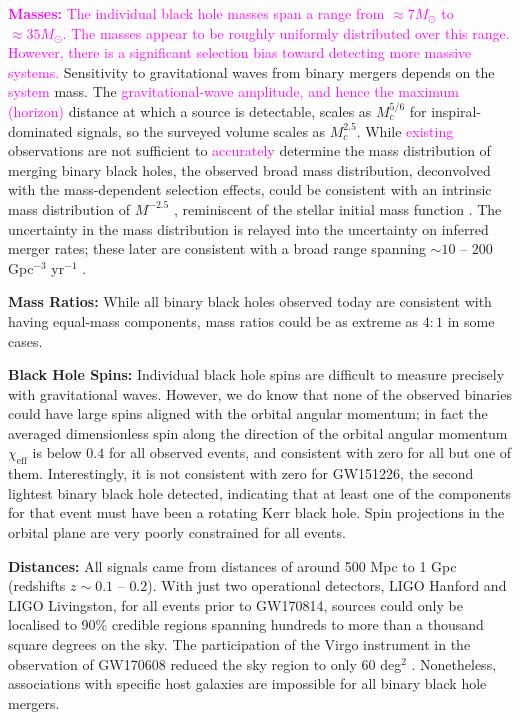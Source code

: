 \documentclass[iop,onecolumn]{revtex4}
\newcommand{\ilya}[1]{\textcolor{magenta}{#1}}
\begin{document}
\textbf{\ilya{Masses:}} \ilya{The individual black hole masses span a range from $\approx 7 M_\odot$ to $\approx 35 M_\odot$.  The masses appear to be roughly uniformly distributed over this range.  However, there is a significant selection bias  toward detecting more massive systems.}  Sensitivity to gravitational waves from binary mergers depends on the \ilya{system} mass.  The \ilya{gravitational-wave amplitude, and hence the maximum (horizon)} distance at which a source is detectable, scales as $M_c^{5/6}$ for inspiral-dominated signals, so the surveyed volume scales as $M_c^{2.5}$.  While \ilya{existing} observations are not sufficient to \ilya{accurately} determine the mass distribution of merging binary black holes, the observed broad mass distribution, deconvolved with the mass-dependent selection effects, could be consistent with an intrinsic mass distribution of $M^{-2.5}$ \ilya{\citep{BBH:O1}}, reminiscent of the stellar initial mass function \citep{Salpeter:1955}.  The uncertainty in the mass distribution is relayed into the uncertainty on inferred merger rates; these later are consistent with a broad range spanning $\sim 10$ -- $200$ Gpc$^{-3}$ yr$^{-1}$ \ilya{\citep{GW170104}}.  

\textbf{Mass Ratios:} While all binary black holes observed today are consistent with having equal-mass components, mass ratios could be as extreme as $4:1$ in some cases.  

\textbf{Black Hole Spins:} Individual black hole spins are difficult to measure precisely with gravitational waves.  However, we do know that none of the observed binaries could have large spins aligned with the orbital angular momentum; in fact the averaged dimensionless spin along the direction of the orbital angular momentum $\chi_\textrm{eff}$ is below $0.4$ for all observed events, and consistent with zero for all but one of them.  Interestingly, it is not consistent with zero for GW151226, the second lightest binary black hole detected, indicating that at least one of the components for that event must have been a rotating Kerr black hole.  Spin projections in the orbital plane are very poorly constrained for all events.

\textbf{Distances:} All signals came from distances of around 500 Mpc to 1 Gpc (redshifts $z\sim 0.1$ -- $0.2$).  With just two operational detectors, LIGO Hanford and LIGO Livingston, for all events prior to GW170814, sources could only be localised to 90\% credible regions spanning hundreds to more than a thousand square degrees on the sky.  The participation of the Virgo instrument in the observation of GW170608 reduced the sky region to only 60 deg$^2$ \ilya{\citep{GW170608}}.  Nonetheless, associations with specific host galaxies are impossible for all binary black hole mergers.  
\end{document}
